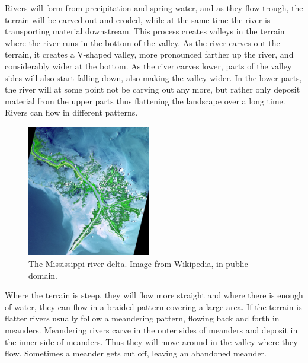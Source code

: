 \documentclass[a4paper,12pt]{report}
\begin{document}
Rivers will form from precipitation and spring water, and as they flow trough, the terrain will be carved out and eroded, while at the same time the river is transporting material downstream. This process creates valleys in the terrain where the river runs in the bottom of the valley. As the river carves out the terrain, it creates a V-shaped valley, more pronounced farther up the river, and considerably wider at the bottom. As the river carves lower, parts of the valley sides will also start falling down, also making the valley wider. In the lower parts, the river will at some point not be carving out any more, but rather only deposit material from the upper parts thus flattening the landscape over a long time. Rivers can flow in different patterns.
\begin{figure}
  \begin{center}
   \vspace{-25pt}
    \includegraphics[width=0.48\textwidth]{thesis/geo/miss.jpg}
  \end{center}
   \vspace{-15pt}
  \caption{The Mississippi river delta. Image from Wikipedia, in public domain.}
   \vspace{0pt}
  \label{fig:miss}
\end{figure}
Where the terrain is steep, they will flow more straight and where there is enough of water, they can flow in a braided pattern covering a large area. If the terrain is flatter rivers usually follow a meandering pattern, flowing back and forth in meanders. Meandering rivers carve in the outer sides of meanders and deposit in the inner side of meanders. Thus they will move around in the valley where they flow. Sometimes a meander gets cut off, leaving an abandoned meander. 
\end{document}
